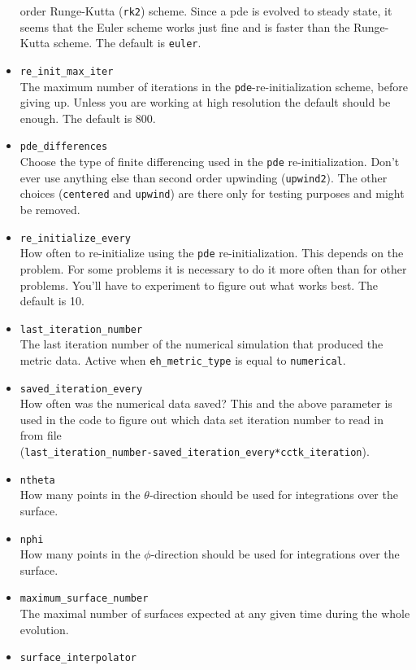 \begin{itemize}
  order Runge-Kutta ({\tt rk2}) scheme. Since a pde is evolved to steady state,
  it seems that the Euler scheme works just fine and is faster than the
  Runge-Kutta scheme. The default is {\tt euler}.
\item {\tt re\_init\_max\_iter} \\
  The maximum number of iterations in the {\tt pde}-re-initialization scheme,
  before giving up. Unless you are working at high resolution the default
  should be enough. The default is 800.
\item {\tt pde\_differences} \\
  Choose the type of finite differencing used in the {\tt pde}
  re-initialization. Don't ever use anything else than second order
  upwinding ({\tt upwind2}). The other choices ({\tt centered} and {\tt upwind})
  are there only for testing purposes and might be removed.
\item {\tt re\_initialize\_every} \\
  How often to re-initialize using the {\tt pde} re-initialization. This
  depends on the problem. For some problems it is necessary to do it more
  often than for other problems. You'll have to experiment to figure out
  what works best. The default is 10.
\item {\tt last\_iteration\_number} \\
  The last iteration number of the numerical
  simulation that produced the metric data. Active when {\tt eh\_metric\_type}
  is equal to {\tt numerical}.
\item {\tt saved\_iteration\_every} \\
  How often was the numerical data saved?
  This and the above parameter is used in the code to figure out which
  data set iteration number to read in from file \\
  ({\tt last\_iteration\_number-saved\_iteration\_every*cctk\_iteration}).
\item {\tt ntheta} \\
  How many points in the $\theta$-direction should be used for integrations
  over the surface.
\item {\tt nphi} \\
  How many points in the $\phi$-direction should be used for integrations
  over the surface.
\item {\tt maximum\_surface\_number} \\
  The maximal number of surfaces expected at any given time during the whole
  evolution.
\item {\tt surface\_interpolator} \\

\end{itemize}
